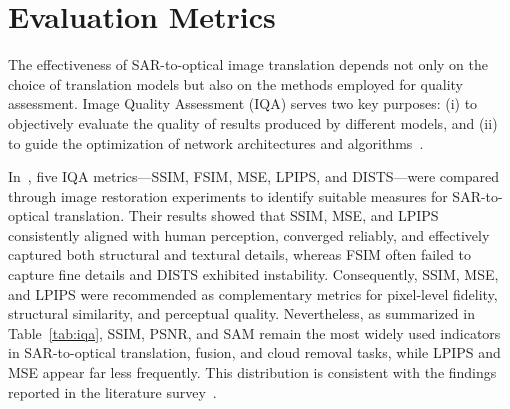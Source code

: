 \section{Evaluation Metrics}
The effectiveness of SAR-to-optical image translation depends not only on the choice of translation models but also on the methods employed for quality assessment. Image Quality Assessment (IQA) serves two key purposes: (i) to objectively evaluate the quality of results produced by different models, and (ii) to guide the optimization of network architectures and algorithms~\cite{quality_assessment_S2OT}.

In~\cite{quality_assessment_S2OT}, five IQA metrics—SSIM, FSIM, MSE, LPIPS, and DISTS—were compared through image restoration experiments to identify suitable measures for SAR-to-optical translation. Their results showed that SSIM, MSE, and LPIPS consistently aligned with human perception, converged reliably, and effectively captured both structural and textural details, whereas FSIM often failed to capture fine details and DISTS exhibited instability. Consequently, SSIM, MSE, and LPIPS were recommended as complementary metrics for pixel-level fidelity, structural similarity, and perceptual quality. Nevertheless, as summarized in Table~\ref{tab:iqa}, SSIM, PSNR, and SAM remain the most widely used indicators in SAR-to-optical translation, fusion, and cloud removal tasks, while LPIPS and MSE appear far less frequently. This distribution is consistent with the findings reported in the literature survey~\cite{sar_2_opt_CGAN_survey_taxonomy}.


